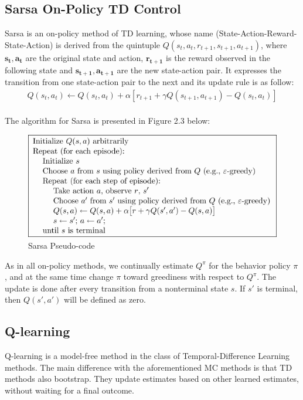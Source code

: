 \documentclass[paper=a4, fontsize=11pt]{scrartcl}
\numberwithin{equation}{section}		%
\numberwithin{figure}{section}			%
\numberwithin{table}{section}				%
\begin{document}
\subsection*{Sarsa On-Policy TD Control}
Sarsa is an on-policy method of TD learning, whose name (State-Action-Reward-State-Action) is derived from the quintuple $Q(s_t, a_t, r_{t+1}, s_{t+1}, a_{t+1})$, where  $\mathbf{s_t, a_t}$ are the original state and action, $\mathbf{r_{t+1}}$ is the reward observed in the following state and $\mathbf{s_{t+1}, a_{t+1}}$ are the new state-action pair. It expresses the transition from one state-action pair to the next and its update rule is as follow:
\begin{align}
Q(s_t, a_t) \gets Q(s_t, a_t)+\alpha[r_{t+1}+\gamma Q(s_{t+1}, a_{t+1})-Q(s_t, a_t)]
\end{align}\\
The algorithm for Sarsa is presented in Figure 2.3 below:
\begin{figure}[H] \centering
\includegraphics[scale=0.6]{sarsa_algorithm.png}
\caption{Sarsa Pseudo-code} \label{figure:Sarsa}
\end{figure}
As in all on-policy methods, we continually estimate $Q^\pi$ for the behavior policy $\pi$, and at the same time change $\pi$ toward greediness with respect to $Q^\pi$. The update is done after every transition from a nonterminal state $s$. If $s'$ is terminal, then $Q(s',a')$ will be defined as zero. \\


\subsection{\textbf {Q-learning}}
Q-learning is a model-free method in the class of Temporal-Difference Learning methods. The main difference with the aforementioned MC methods is that TD methods also bootstrap. They update estimates based on other learned estimates, without waiting for a final outcome.
\end{document}
